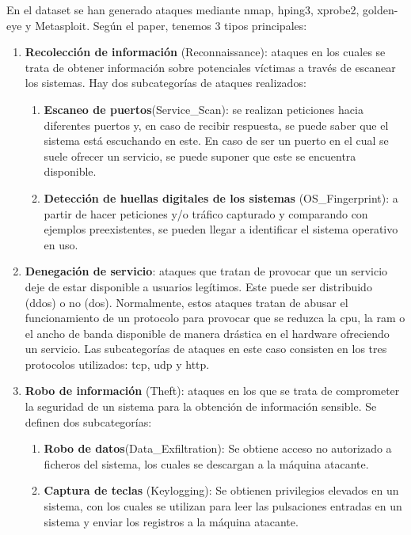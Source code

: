 En el dataset se han generado ataques mediante nmap, hping3, xprobe2, golden-eye y Metasploit. Según el paper, tenemos 3 tipos principales: 
\begin{enumerate}
    \item \textbf{Recolección de información} (Reconnaissance): ataques en los cuales se trata de obtener información sobre potenciales víctimas a través de escanear los sistemas. Hay dos subcategorías de ataques realizados:
    \begin{enumerate}
        \item \textbf{Escaneo de puertos}(Service\_Scan): se realizan peticiones hacia diferentes puertos y, en caso de recibir respuesta, se puede saber que el sistema está escuchando en este. En caso de ser un puerto en el cual se suele ofrecer un servicio, se puede suponer que este se encuentra disponible.
        \item \textbf{Detección de huellas digitales de los sistemas} (OS\_Fingerprint): a partir de hacer peticiones y/o tráfico capturado y comparando con ejemplos preexistentes, se pueden llegar a identificar el sistema operativo en uso.
    \end{enumerate}
    \item \textbf{Denegación de servicio}: ataques que tratan de provocar que un servicio deje de estar disponible a usuarios legítimos. Este puede ser distribuido (\acrshort{ddos}) o no (\acrshort{dos}). Normalmente, estos ataques tratan de abusar el funcionamiento de un protocolo para provocar que se reduzca la \acrshort{cpu}, la \acrshort{ram} o el ancho de banda disponible de manera drástica en el hardware ofreciendo un servicio. Las subcategorías de ataques en este caso consisten en los tres protocolos utilizados: \acrshort{tcp}, \acrshort{udp} y \acrshort{http}.
    \item \textbf{Robo de información} (Theft): ataques en los que se trata de comprometer la seguridad de un sistema para la obtención de información sensible. Se definen dos subcategorías:
    \begin{enumerate}
        \item \textbf{Robo de datos}(Data\_Exfiltration): Se obtiene acceso no autorizado a ficheros del sistema, los cuales se descargan a la máquina atacante.
        \item \textbf{Captura de teclas} (Keylogging): Se obtienen privilegios elevados en un sistema, con los cuales se utilizan para leer las pulsaciones entradas en un sistema y enviar los registros a la máquina atacante.
    \end{enumerate}
\end{enumerate}


